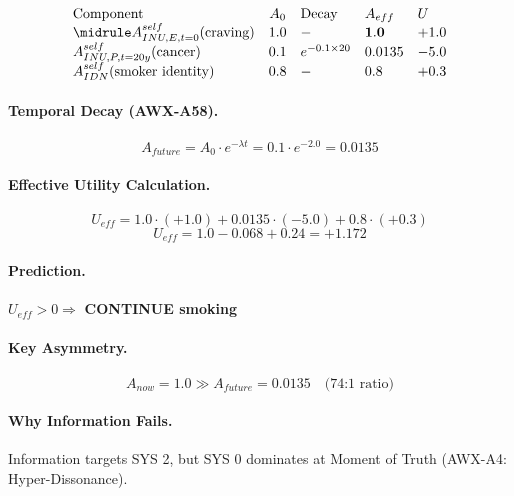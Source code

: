 \begin{equation}
\begin{array}{lclll}
\text{Component} & A_0 & \text{Decay} & A_{eff} & U \\
\midrule
A^{self}_{INU,E,t=0}(\text{craving}) & 1.0 & - & \mathbf{1.0} & +1.0 \\
A^{self}_{INU,P,t=20y}(\text{cancer}) & 0.1 & e^{-0.1 \times 20} & 0.0135 & -5.0 \\
A^{self}_{IDN}(\text{smoker identity}) & 0.8 & - & 0.8 & +0.3
\end{array}
\end{equation}

\paragraph{Temporal Decay (AWX-A58).}
\begin{equation}
A_{future} = A_0 \cdot e^{-\lambda t} = 0.1 \cdot e^{-2.0} = 0.0135
\end{equation}

\paragraph{Effective Utility Calculation.}
\begin{equation}
U_{eff} = 1.0 \cdot (+1.0) + 0.0135 \cdot (-5.0) + 0.8 \cdot (+0.3)
\end{equation}
\begin{equation}
\boxed{U_{eff} = 1.0 - 0.068 + 0.24 = \mathbf{+1.172}}
\end{equation}

\paragraph{Prediction.}
$U_{eff} > 0 \Rightarrow$ \textbf{CONTINUE smoking}

\paragraph{Key Asymmetry.}
\begin{equation}
A_{now} = 1.0 \gg A_{future} = 0.0135 \quad \text{(74:1 ratio)}
\end{equation}

\paragraph{Why Information Fails.}
Information targets SYS 2, but SYS 0 dominates at Moment of Truth (AWX-A4: Hyper-Dissonance).

